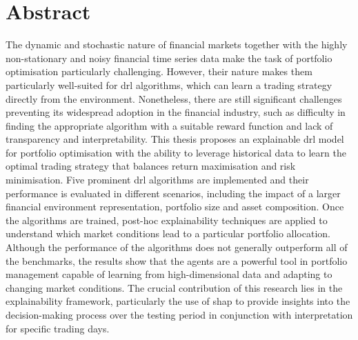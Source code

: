 \chapter*{Abstract}

The dynamic and stochastic nature of financial markets together with the highly non-stationary and noisy financial time series data make the task of portfolio optimisation particularly challenging. However, their nature makes them particularly well-suited for \acrfull{drl} algorithms, which can learn a trading strategy directly from the environment. Nonetheless, there are still significant challenges preventing its widespread adoption in the financial industry, such as difficulty in finding the appropriate algorithm with a suitable reward function and lack of transparency and interpretability. This thesis proposes an explainable \acrshort{drl} model for portfolio optimisation with the ability to leverage historical data to learn the optimal trading strategy that balances return maximisation and risk minimisation. Five prominent \acrshort{drl} algorithms are implemented and their performance is evaluated in different scenarios, including the impact of a larger financial environment representation, portfolio size and asset composition. Once the algorithms are trained, post-hoc explainability techniques are applied to understand which market conditions lead to a particular portfolio allocation. Although the performance of the algorithms does not generally outperform all of the benchmarks, the results show that the agents are a powerful tool in portfolio management capable of learning from high-dimensional data and adapting to changing market conditions. The crucial contribution of this research lies in the explainability framework, particularly the use of \acrfull{shap} to provide insights into the decision-making process over the testing period in conjunction with interpretation for specific trading days.  
